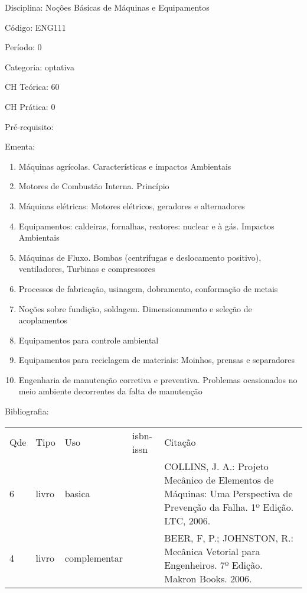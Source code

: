 \documentclass[12pt,a4paper,twoside]{report}
\begin{document}
Disciplina: Noções Básicas de Máquinas e Equipamentos

Código: ENG111

Período: 0

Categoria: optativa

CH Teórica: 60

CH Prática: 0




Pré-requisito:
\begin{enumerate}
\end{enumerate}

Ementa:
\begin{enumerate}
\item Máquinas agrícolas. Características e impactos Ambientais
\item Motores de Combustão Interna. Princípio
\item Máquinas elétricas: Motores elétricos, geradores e alternadores
\item Equipamentos: caldeiras, fornalhas, reatores: nuclear e à gás. Impactos Ambientais
\item Máquinas de Fluxo. Bombas (centrifugas e deslocamento positivo), ventiladores, Turbinas e compressores
\item Processos de fabricação, usinagem, dobramento, conformação de metais
\item Noções sobre fundição, soldagem. Dimensionamento e seleção de acoplamentos
\item Equipamentos para controle ambiental
\item Equipamentos para reciclagem de materiais: Moinhos, prensas e separadores
\item Engenharia de manutenção corretiva e preventiva. Problemas ocasionados no meio ambiente decorrentes da falta de manutenção
\end{enumerate}



Bibliografia:


\begin{tabular}{llllp{8cm}}
Qde & Tipo & Uso & isbn-issn & Citação \\
6&livro&basica&&COLLINS, J. A.: Projeto Mecânico de Elementos de Máquinas: Uma Perspectiva de Prevenção da Falha. 1º Edição. LTC, 2006.\\
4&livro&complementar&&BEER, F, P.; JOHNSTON, R.: Mecânica Vetorial para Engenheiros. 7º Edição. Makron Books. 2006.\\
\end{tabular}
\end{document}
